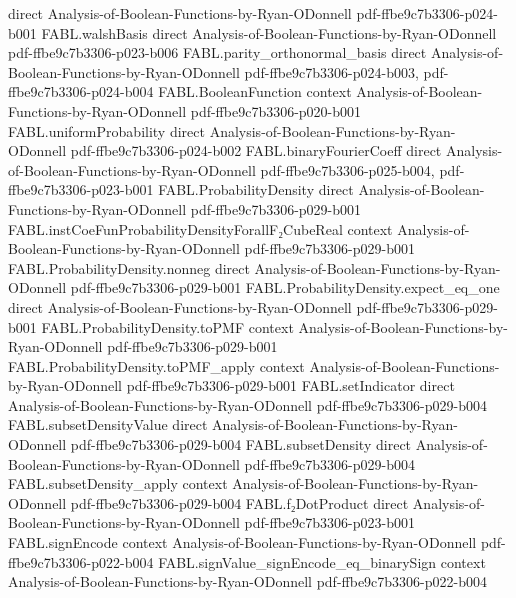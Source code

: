 \begin{theorem}
  {direct}
  {Analysis-of-Boolean-Functions-by-Ryan-ODonnell}
  {pdf-ffbe9c7b3306-p024-b001}
\proofstep
  {FABL.walshBasis}
  {direct}
  {Analysis-of-Boolean-Functions-by-Ryan-ODonnell}
  {pdf-ffbe9c7b3306-p023-b006}
\proofstep
  {FABL.parity_orthonormal_basis}
  {direct}
  {Analysis-of-Boolean-Functions-by-Ryan-ODonnell}
  {pdf-ffbe9c7b3306-p024-b003,
    pdf-ffbe9c7b3306-p024-b004}
\proofstep
  {FABL.BooleanFunction}
  {context}
  {Analysis-of-Boolean-Functions-by-Ryan-ODonnell}
  {pdf-ffbe9c7b3306-p020-b001}
\proofstep
  {FABL.uniformProbability}
  {direct}
  {Analysis-of-Boolean-Functions-by-Ryan-ODonnell}
  {pdf-ffbe9c7b3306-p024-b002}
\proofstep
  {FABL.binaryFourierCoeff}
  {direct}
  {Analysis-of-Boolean-Functions-by-Ryan-ODonnell}
  {pdf-ffbe9c7b3306-p025-b004,
    pdf-ffbe9c7b3306-p023-b001}
\proofstep
  {FABL.ProbabilityDensity}
  {direct}
  {Analysis-of-Boolean-Functions-by-Ryan-ODonnell}
  {pdf-ffbe9c7b3306-p029-b001}
\proofstep
  {FABL.instCoeFunProbabilityDensityForallF₂CubeReal}
  {context}
  {Analysis-of-Boolean-Functions-by-Ryan-ODonnell}
  {pdf-ffbe9c7b3306-p029-b001}
\proofstep
  {FABL.ProbabilityDensity.nonneg}
  {direct}
  {Analysis-of-Boolean-Functions-by-Ryan-ODonnell}
  {pdf-ffbe9c7b3306-p029-b001}
\proofstep
  {FABL.ProbabilityDensity.expect_eq_one}
  {direct}
  {Analysis-of-Boolean-Functions-by-Ryan-ODonnell}
  {pdf-ffbe9c7b3306-p029-b001}
\proofstep
  {FABL.ProbabilityDensity.toPMF}
  {context}
  {Analysis-of-Boolean-Functions-by-Ryan-ODonnell}
  {pdf-ffbe9c7b3306-p029-b001}
\proofstep
  {FABL.ProbabilityDensity.toPMF_apply}
  {context}
  {Analysis-of-Boolean-Functions-by-Ryan-ODonnell}
  {pdf-ffbe9c7b3306-p029-b001}
\proofstep
  {FABL.setIndicator}
  {direct}
  {Analysis-of-Boolean-Functions-by-Ryan-ODonnell}
  {pdf-ffbe9c7b3306-p029-b004}
\proofstep
  {FABL.subsetDensityValue}
  {direct}
  {Analysis-of-Boolean-Functions-by-Ryan-ODonnell}
  {pdf-ffbe9c7b3306-p029-b004}
\proofstep
  {FABL.subsetDensity}
  {direct}
  {Analysis-of-Boolean-Functions-by-Ryan-ODonnell}
  {pdf-ffbe9c7b3306-p029-b004}
\proofstep
  {FABL.subsetDensity_apply}
  {context}
  {Analysis-of-Boolean-Functions-by-Ryan-ODonnell}
  {pdf-ffbe9c7b3306-p029-b004}
\proofstep
  {FABL.f₂DotProduct}
  {direct}
  {Analysis-of-Boolean-Functions-by-Ryan-ODonnell}
  {pdf-ffbe9c7b3306-p023-b001}
\proofstep
  {FABL.signEncode}
  {context}
  {Analysis-of-Boolean-Functions-by-Ryan-ODonnell}
  {pdf-ffbe9c7b3306-p022-b004}
\proofstep
  {FABL.signValue_signEncode_eq_binarySign}
  {context}
  {Analysis-of-Boolean-Functions-by-Ryan-ODonnell}
  {pdf-ffbe9c7b3306-p022-b004}
\proofstep

\end{theorem}
